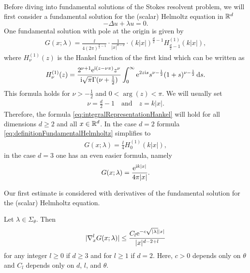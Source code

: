 Before diving into fundamental solutions of the Stokes resolvent problem, we will first consider a fundamental solution for the (scalar) Helmoltz equation in $\mathbb{R}^d$
$$
-\Delta u + \lambda u = 0.
$$
One fundamental solution with pole at the origin is given by
\begin{align}
  \label{eq:definitionFundamentalHelmholtz}
  G(x; \lambda) = \frac{\ii}{4 ( 2\pi )^{\frac{d}{2} - 1}} \cdot \frac{1}{|x|^{d - 2}} \cdot (k |x|)^{\frac{d}{2} - 1} H_{\frac{d}{2} - 1}^{(1)} (k|x|),
\end{align}
where $H_{\nu}^{(1)}(z)$ is the Hankel function of the first kind which can be written as
\begin{align}
  \label{eq:integralRepresentationHankel}
  H_\nu^{(1)}(z) = \frac{2^{\nu + 1} \mathrm{e}^{\mathrm{i}(z - \nu \pi)} z^\nu}{\mathrm{i} \sqrt{\pi} \Gamma(\nu + \frac{1}{2})} \int_0^\infty \mathrm{e}^{2 z \mathrm{i} s} s^{\nu - \frac{1}{2}} (1 + s)^{\nu - \frac{1}{2}} \, {\operatorname{d}\!{s}}.
\end{align}
This formula holds for $\nu > -\frac{1}{2}$ and $0 < \arg(z) < \pi$.
We will usually set 
\begin{align*}
\nu = \frac{d}{2} - 1 \quad\text{and}\quad z = k|x|. 
\end{align*}
Therefore, the formula \eqref{eq:integralRepresentationHankel} will hold for all dimensions $d \geq 2$ and all $x \in \mathbb{R}^d$.
In the case $d = 2$ formula \eqref{eq:definitionFundamentalHelmholtz} simplifies to 
\begin{align}
  \label{eq:2dDefinitionFundamentalHelmholtz}
  G(x;\lambda) = \frac{\ii}{4} H_{0}^{(1)}(k|x|),
\end{align}
in the case $d = 3$ one has an even easier formula, namely
\begin{align}
  \label{eq:3dDefinitionFundamentalHelmholtz}
  G(x; \lambda) = \frac{\mathrm{e}^{\mathrm{i} k |x|}}{4 \pi |x|}.
\end{align}

Our first estimate is considered with derivatives of the fundamental solution for the (scalar) Helmholtz equation.

\begin{lem}
  \label{lem:estimateHelmholtzDerivatives}
  Let $\lambda \in \Sigma_\theta$.
  Then
  \begin{align}
    \label{eq:estimateHelmholtzDerivatives}
    |\nabla_x^l G(x; \lambda)| \leq \frac{ C_l \mathrm{e}^{-c \sqrt{|\lambda|} |x|}}{|x|^{d - 2 + l}}
  \end{align}
  for any integer $l \geq 0$ if $d \geq 3$ and for $l \geq 1$ if $d = 2$.
  Here, $c > 0$ depends only on $\theta$ and $C_l$ depends only on $d$, $l$, and $\theta$.
\end{lem}

